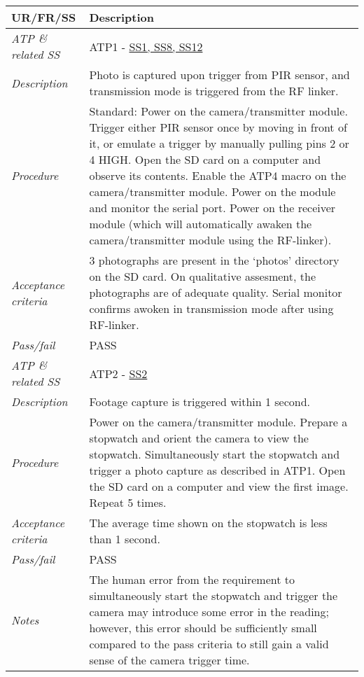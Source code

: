 \documentclass[class=report,11pt,crop=false]{standalone}
\begin{document}
\begin{table}[!ht]
    \centering
    \begin{scriptsize}
    \begin{tabularx}{\textwidth}{|p{} X|}
        
        \hline
        \textbf{UR/FR/SS} & \textbf{Description}\\ \hline
        \textit{ATP \& related SS} & ATP1 - \hyperlink{tab:firmware-requirements}{SS1, SS8, SS12}\\
        \textit{Description} & Photo is captured upon trigger from PIR sensor, and transmission mode is triggered from the RF linker.\\
        \textit{Procedure} & Standard: Power on the camera/transmitter module. Trigger either PIR sensor once by moving in front of it, or emulate a trigger by manually pulling pins 2 or 4 HIGH. Open the SD card on a computer and observe its contents. Enable the ATP4 macro on the camera/transmitter module. Power on the module and monitor the serial port. Power on the receiver module (which will automatically awaken the camera/transmitter module using the RF-linker).\\
        \textit{Acceptance criteria} & 3 photographs are present in the `photos' directory on the SD card. On qualitative assesment, the photographs are of adequate quality. Serial monitor confirms awoken in transmission mode after using RF-linker.\\ 
        \textit{Pass/fail} & PASS \\ \hline

        \textit{ATP \& related SS} & ATP2 - \hyperlink{tab:firmware-requirements}{SS2}\\
        \textit{Description} & Footage capture is triggered within 1 second.\\
        \textit{Procedure} & Power on the camera/transmitter module. Prepare a stopwatch and orient the camera to view the stopwatch. Simultaneously start the stopwatch and trigger a photo capture as described in ATP1. Open the SD card on a computer and view the first image. Repeat 5 times.\\
        \textit{Acceptance criteria} & The average time shown on the stopwatch is less than 1 second.\\ 
        \textit{Pass/fail} & PASS\\
        \textit{Notes} & The human error from the requirement to simultaneously start the stopwatch and trigger the camera may introduce some error in the reading; however, this error should be sufficiently small compared to the pass criteria to still gain a valid sense of the camera trigger time. \\ \hline


\end{tabularx}
\end{scriptsize}
\end{table}
\end{document}
